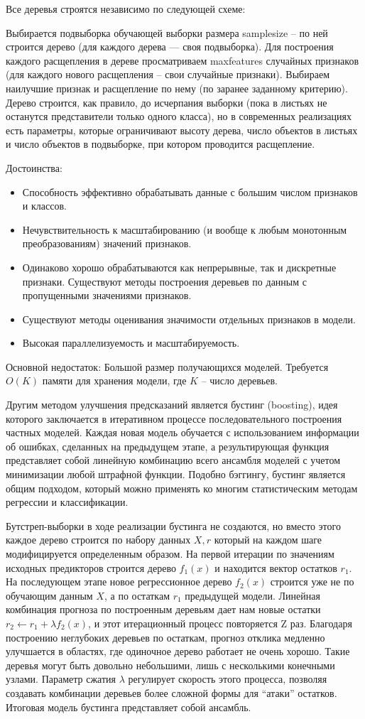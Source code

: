 \documentclass[a4paper, 12pt]{article}
\begin{document}
	Все деревья строятся независимо по следующей схеме:
	
	Выбирается подвыборка обучающей выборки размера samplesize -- по ней строится дерево (для каждого дерева — своя подвыборка).
	Для построения каждого расщепления в дереве просматриваем maxfeatures случайных признаков (для каждого нового расщепления -- свои случайные признаки).
	Выбираем наилучшие признак и расщепление по нему (по заранее заданному критерию). Дерево строится, как правило, до исчерпания выборки (пока в листьях не останутся представители только одного класса), но в современных реализациях есть параметры, которые ограничивают высоту дерева, число объектов в листьях и число объектов в подвыборке, при котором проводится расщепление.
	
	Достоинства:
	\begin{itemize}
		\item Способность эффективно обрабатывать данные с большим числом признаков и классов.
		\item Нечувствительность к масштабированию (и вообще к любым монотонным преобразованиям) значений признаков.
		\item Одинаково хорошо обрабатываются как непрерывные, так и дискретные признаки. Существуют методы построения деревьев по данным с пропущенными значениями признаков.
		\item Существуют методы оценивания значимости отдельных признаков в модели.
		\item Высокая параллелизуемость и масштабируемость.
	\end{itemize}
	Основной недостаток: Большой размер получающихся моделей. Требуется $O(K)$ памяти для хранения модели, где $K$ -- число деревьев.

	Другим методом улучшения предсказаний является бустинг (boosting), идея которого заключается в итеративном процессе последовательного построения частных моделей. Каждая новая модель обучается с использованием информации об ошибках, сделанных на предыдущем этапе, а результирующая функция представляет собой линейную комбинацию всего ансамбля моделей с учетом минимизации любой штрафной функции. Подобно бэггингу, бустинг является общим подходом, который можно применять ко многим статистическим методам регрессии и классификации.

	Бутстреп-выборки в ходе реализации бустинга не создаются, но вместо этого каждое дерево строится по набору данных  $X,r$ который на каждом шаге модифицируется определенным образом. На первой итерации по значениям исходных предикторов строится дерево  $f_{1}(x)$ и находится вектор остатков  $r_{1}$. На последующем этапе новое регрессионное дерево  $f_{2}(x)$ строится уже не по обучающим данным $X$, а по остаткам $r_{1}$ предыдущей модели. Линейная комбинация прогноза по построенным деревьям дает нам новые остатки $r_{2}←r_{1}+\lambda f_{2}(x)$, и этот итерационный процесс повторяется Z раз. Благодаря построению неглубоких деревьев по остаткам, прогноз отклика медленно улучшается в областях, где одиночное дерево работает не очень хорошо. Такие деревья могут быть довольно небольшими, лишь с несколькими конечными узлами. Параметр сжатия $\lambda$ регулирует скорость этого процесса, позволяя создавать комбинации деревьев более сложной формы для “атаки” остатков. Итоговая модель бустинга представляет собой ансамбль.
\end{document}

